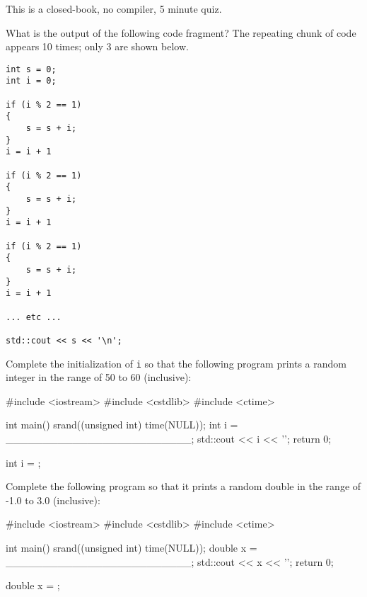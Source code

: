 

This is a closed-book, no compiler, 5 minute quiz.

\nextq
What is the output of the following code fragment?
The repeating chunk of code appears 10 times; only 3 are shown below.
\begin{Verbatim}[frame=single,fontsize=\footnotesize]
int s = 0;
int i = 0;

if (i % 2 == 1)
{
    s = s + i;
}
i = i + 1

if (i % 2 == 1)
{
    s = s + i;
}
i = i + 1

if (i % 2 == 1)
{
    s = s + i;
}
i = i + 1

... etc ...

std::cout << s << '\n';
\end{Verbatim}
\ANSWER
\begin{answercode}

\end{answercode}

\nextq
Complete the initialization of \verb!i! so that the following program
prints a random integer in the range of 50 to 60 (inclusive):
\begin{console}[commandchars=\~\!\@,fontsize=\footnotesize]
#include <iostream>
#include <cstdlib>
#include <ctime>

int main()
{
    srand((unsigned int) time(NULL));
    int i = _________________________;
    std::cout << i << '\n';
    return 0;
}
\end{console}
\ANSWER
\begin{answercode}
int i =               ;
\end{answercode}

\nextq
Complete the following program so that it prints a random double in the
range of -1.0 to 3.0 (inclusive):
\begin{console}[commandchars=\~\!\@,fontsize=\footnotesize]
#include <iostream>
#include <cstdlib>
#include <ctime>

int main()
{
    srand((unsigned int) time(NULL));
    double x = _________________________;
    std::cout << x << '\n';
    return 0;
}
\end{console}
\ANSWER
\begin{answercode}
double x =               ;
\end{answercode}

